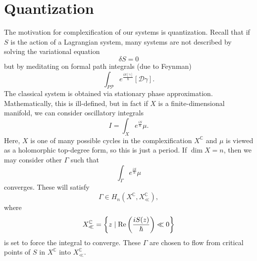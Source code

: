 \documentclass[leqno, openany]{memoir}
\theoremstyle{definition}
\theoremstyle{remark}
\theoremstyle{plain}
\theoremstyle{definition}
\theoremstyle{remark}
\newcommand{\C}{\mathbb{C}}
\newcommand{\mc}[1]{\mathcal{#1}}
\begin{document}
\section{Quantization}
\label{sec:quantization}

The motivation for complexification of our systems is quantization. Recall that if $S$ is the action of a Lagrangian system, many systems are not described by solving the variational equation
\[ \delta S = 0 \]
but by meditating on formal path integrals (due to Feynman)
\[ \int_{P \mc{P}} e^{\frac{i S[\gamma]}{\hslash}} [\mc{D}\gamma]. \]
The classical system is obtained via stationary phase approximation. Mathematically, this is ill-defined, but in fact if $X$ is a finite-dimensional manifold, we can consider oscillatory integrals
\[ I = \int_X e^{\frac{iS}{\hslash}} \mu. \]
Here, $X$ is one of many possible cycles in the complexification $X^{\C}$ and $\mu$ is viewed as a holomorphic top-degree form, so this is just a period. If $\dim X = n$, then we may consider other $\Gamma$ such that
\[ \int_{\Gamma} e^{\frac{iS}{\hslash}} \mu \]
converges. These will satisfy
\[ \Gamma \in H_n(X^{\C}, X^{\C}_{\ll}), \]
where
\[ X^{\C}_{\ll} = \qty{z \mid \Re\qty(\frac{iS(z)}{\hslash}) \ll 0} \]
is set to force the integral to converge. These $\Gamma$ are chosen to flow from critical points of $S$ in $X^{\C}$ into $X^{\C}_{\ll}$.
\end{document}
